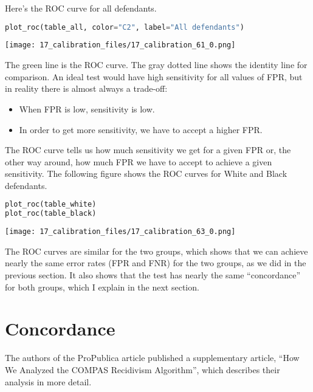 \pagebreak

Here's the ROC curve for all defendants.

\begin{lstlisting}[language=Python,style=source]
plot_roc(table_all, color="C2", label="All defendants")
\end{lstlisting}

\begin{center}
\texttt{[image: 17\_calibration\_files/17\_calibration\_61\_0.png]}
\end{center}

The green line is the ROC curve. The gray dotted line shows the identity
line for comparison. An ideal test would have high sensitivity for all
values of FPR, but in reality there is almost always a trade-off:

\begin{itemize}
\item
  When FPR is low, sensitivity is low.
\item
  In order to get more sensitivity, we have to accept a higher FPR.
\end{itemize}

The ROC curve tells us how much sensitivity we get for a given FPR or,
the other way around, how much FPR we have to accept to achieve a given
sensitivity. The following figure shows the ROC curves for White and
Black defendants.

\begin{lstlisting}[language=Python,style=source]
plot_roc(table_white)
plot_roc(table_black)
\end{lstlisting}

\begin{center}
\texttt{[image: 17\_calibration\_files/17\_calibration\_63\_0.png]}
\end{center}

The ROC curves are similar for the two groups, which shows that we can
achieve nearly the same error rates (FPR and FNR) for the two groups, as
we did in the previous section. It also shows that the test has nearly
the same ``concordance'' for both groups, which I explain in the next
section.

\section{Concordance}\label{concordance}

The authors of the ProPublica article published a supplementary article,
``How We Analyzed the COMPAS Recidivism Algorithm'', which describes
their analysis in more detail.

